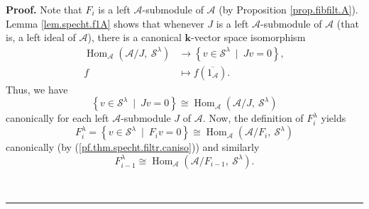 \documentclass[numbers=enddot,12pt,final,onecolumn,notitlepage]{scrartcl}%
\theoremstyle{definition}
\newenvironment{proof}[1][Proof]{\noindent\textbf{#1.} }{\ \rule{0.5em}{0.5em}}
\begin{document}
\begin{proof}
Note that $F_{i}$ is a left $\mathcal{A}$-submodule of $\mathcal{A}$ (by
Proposition \ref{prop.fibfilt.A}). Lemma \ref{lem.specht.f1A} shows that
whenever $J$ is a left $\mathcal{A}$-submodule of $\mathcal{A}$ (that is, a
left ideal of $\mathcal{A}$), there is a canonical $\mathbf{k}$-vector space
isomorphism%
\begin{align*}
\operatorname*{Hom}\nolimits_{\mathcal{A}}\left(  \mathcal{A}/J,\ \mathcal{S}%
^{\lambda}\right)   &  \rightarrow\left\{  v\in\mathcal{S}^{\lambda}%
\ \mid\ Jv=0\right\}  ,\\
f  &  \mapsto f\left(  \overline{1_{\mathcal{A}}}\right)  .
\end{align*}
Thus, we have%
\begin{equation}
\left\{  v\in\mathcal{S}^{\lambda}\ \mid\ Jv=0\right\}  \cong%
\operatorname*{Hom}\nolimits_{\mathcal{A}}\left(  \mathcal{A}/J,\ \mathcal{S}%
^{\lambda}\right)  \label{pf.thm.specht.filtr.caniso}%
\end{equation}
canonically for each left $\mathcal{A}$-submodule $J$ of $\mathcal{A}$. Now,
the definition of $F_{i}^{\lambda}$ yields%
\begin{equation}
F_{i}^{\lambda}=\left\{  v\in\mathcal{S}^{\lambda}\ \mid\ F_{i}v=0\right\}
\cong\operatorname*{Hom}\nolimits_{\mathcal{A}}\left(  \mathcal{A}%
/F_{i},\ \mathcal{S}^{\lambda}\right)  \label{pf.thm.specht.filtr.canisoi}%
\end{equation}
canonically (by (\ref{pf.thm.specht.filtr.caniso})) and similarly%
\begin{equation}
F_{i-1}^{\lambda}\cong\operatorname*{Hom}\nolimits_{\mathcal{A}}\left(
\mathcal{A}/F_{i-1},\ \mathcal{S}^{\lambda}\right)  .
\label{pf.thm.specht.filtr.canisoi-1}%
\end{equation}



\end{proof}
\end{document}
